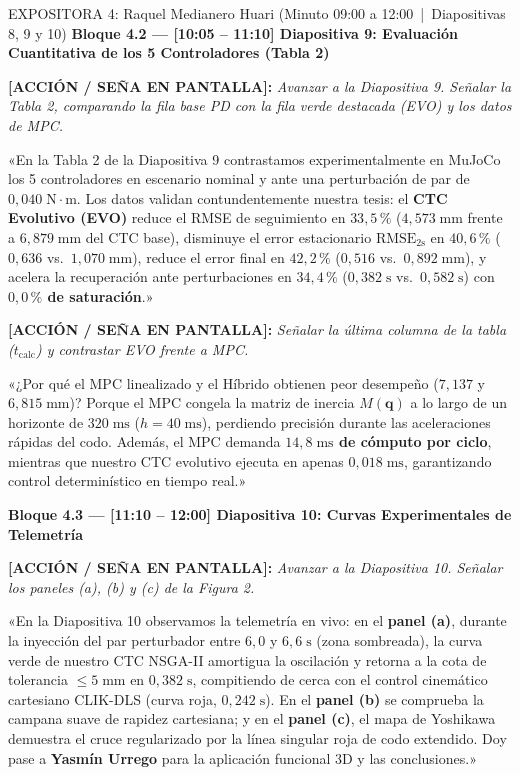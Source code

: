 \documentclass[11pt,a4paper]{article}
\newcommand{\accion}[1]{%
  \par\smallskip\noindent%
  {\color{uniGranate}\textbf{[ACCIÓN / SEÑA EN PANTALLA]:}} {\itshape\color{uniAzul!90!black} #1}\par\smallskip%
}
\newcommand{\speech}[1]{%
  \noindent{\color{verdeOk!85!black}\textbf{[SPEECH]:}} «#1»\par\medskip%
}
\begin{document}
\begin{cajaexpositor}[verdeOk]{EXPOSITORA 4: Raquel Medianero Huari (Minuto 09:00 a 12:00 \,|\, Diapositivas 8, 9 y 10)}
\textbf{\color{verdeOk}Bloque 4.2 --- [10:05 -- 11:10] Diapositiva 9: Evaluación Cuantitativa de los 5 Controladores (Tabla 2)}
\accion{Avanzar a la Diapositiva 9. Señalar la Tabla 2, comparando la fila base PD con la fila verde destacada (EVO) y los datos de MPC.}
\speech{En la Tabla 2 de la Diapositiva 9 contrastamos experimentalmente en MuJoCo los 5 controladores en escenario nominal y ante una perturbación de par de $0{,}040\;\text{N}\cdot\text{m}$. Los datos validan contundentemente nuestra tesis: el \textbf{CTC Evolutivo (EVO)} reduce el RMSE de seguimiento en \textbf{$33{,}5\,\%$} ($4{,}573\;\text{mm}$ frente a $6{,}879\;\text{mm}$ del CTC base), disminuye el error estacionario $\text{RMSE}_{2\text{s}}$ en \textbf{$40{,}6\,\%$} ($0{,}636$ vs.\ $1{,}070\;\text{mm}$), reduce el error final en \textbf{$42{,}2\,\%$} ($0{,}516$ vs.\ $0{,}892\;\text{mm}$), y acelera la recuperación ante perturbaciones en \textbf{$34{,}4\,\%$} ($0{,}382\;\text{s}$ vs.\ $0{,}582\;\text{s}$) con \textbf{$0{,}0\,\%$ de saturación}.}

\accion{Señalar la última columna de la tabla ($t_{\text{calc}}$) y contrastar EVO frente a MPC.}
\speech{¿Por qué el MPC linealizado y el Híbrido obtienen peor desempeño ($7{,}137$ y $6{,}815\;\text{mm}$)? Porque el MPC congela la matriz de inercia $M(\bm{q})$ a lo largo de un horizonte de $320\;\text{ms}$ ($h=40\;\text{ms}$), perdiendo precisión durante las aceleraciones rápidas del codo. Además, el MPC demanda \textbf{$14{,}8\;\text{ms}$ de cómputo por ciclo}, mientras que nuestro CTC evolutivo ejecuta en apenas \textbf{$0{,}018\;\text{ms}$}, garantizando control determinístico en tiempo real.}

\textbf{\color{verdeOk}Bloque 4.3 --- [11:10 -- 12:00] Diapositiva 10: Curvas Experimentales de Telemetría}
\accion{Avanzar a la Diapositiva 10. Señalar los paneles (a), (b) y (c) de la Figura 2.}
\speech{En la Diapositiva 10 observamos la telemetría en vivo: en el \textbf{panel (a)}, durante la inyección del par perturbador entre $6{,}0$ y $6{,}6\;\text{s}$ (zona sombreada), la curva verde de nuestro CTC NSGA-II amortigua la oscilación y retorna a la cota de tolerancia $\le 5\;\text{mm}$ en $0{,}382\;\text{s}$, compitiendo de cerca con el control cinemático cartesiano CLIK-DLS (curva roja, $0{,}242\;\text{s}$). En el \textbf{panel (b)} se comprueba la campana suave de rapidez cartesiana; y en el \textbf{panel (c)}, el mapa de Yoshikawa demuestra el cruce regularizado por la línea singular roja de codo extendido. Doy pase a \textbf{Yasmín Urrego} para la aplicación funcional 3D y las conclusiones.}
\end{cajaexpositor}
\end{document}
